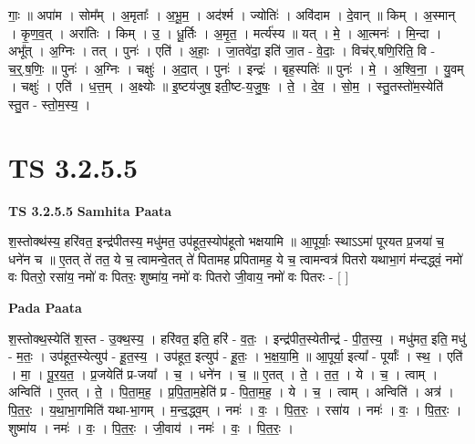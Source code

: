 \documentclass[17pt]{extarticle}
\begin{document}
गाः॒ ॥ अपा॑म । सोम᳚म् । अ॒मृताः᳚ । अ॒भू॒म॒ । अद॑र्श्म । ज्योतिः॑ । अवि॑दाम । दे॒वान् ॥ किम् । अ॒स्मान् । कृ॒ण॒व॒त् । अरा॑तिः । किम् । उ॒ । धू॒र्तिः । अ॒मृ॒त॒ । मर्त्य॑स्य ॥ यत् । मे॒ । आ॒त्मनः॑ । मि॒न्दा । अभू᳚त् । अ॒ग्निः । तत् । पुनः॑ । एति॑ । अ॒हाः॒ । जा॒तवे॑दा॒ इति॑ जा॒त - वे॒दाः॒ । विच॑र्.षणि॒रिति॒ वि - च॒र्॒.ष॒णिः॒ ॥ पुनः॑ । अ॒ग्निः । चक्षुः॑ । अ॒दा॒त् । पुनः॑ । इन्द्रः॑ । बृह॒स्पतिः॑ ॥ पुनः॑ । मे॒ । अ॒श्वि॒ना॒ । यु॒वम् । चक्षुः॑ । एति॑ । ध॒त्त॒म् । अ॒क्ष्योः ॥ इ॒ष्टय॑जुष॒ इती॒ष्ट-य॒जु॒षः॒ । ते॒ । दे॒व॒ । सो॒म॒ । स्तु॒तस्तो॑म॒स्येति॑ स्तु॒त - स्तो॒म॒स्य॒ ।  \newline




\section*{ TS 3.2.5.5 }

\textbf{TS 3.2.5.5 } \newline
\textbf{Samhita Paata} \newline

श॒स्तोक्थ॑स्य॒ हरि॑वत॒ इन्द्र॑पीतस्य॒ मधु॑मत॒ उप॑हूत॒स्योप॑हूतो भक्षयामि ॥ आ॒पूर्याः॒ स्थाऽऽमा॑ पूरयत प्र॒जया॑ च॒ धने॑न च ॥ ए॒तत् ते॑ तत॒ ये च॒ त्वामन्वे॒तत् ते॑ पितामह प्रपितामह॒ ये च॒ त्वामन्वत्र॑ पितरो यथाभा॒गं म॑न्दद्ध्वं॒ नमो॑ वः पितरो॒ रसा॑य॒ नमो॑ वः पितरः॒ शुष्मा॑य॒ नमो॑ वः पितरो जी॒वाय॒ नमो॑ वः पितरः - [  ] \newline

\textbf{Pada Paata} \newline

श॒स्तोक्थ॒स्येति॑ श॒स्त - उ॒क्थ॒स्य॒ । हरि॑वत॒ इति॒ हरि॑ - व॒तः॒ । इन्द्र॑पीत॒स्येतीन्द्र॑ - पी॒त॒स्य॒ । मधु॑मत॒ इति॒ मधु॑ - म॒तः॒ । उप॑हूत॒स्येत्युप॑ - हू॒त॒स्य॒ । उप॑हूत॒ इत्युप॑ - हू॒तः॒ । भ॒क्ष॒या॒मि॒ ॥ आ॒पूर्या॒ इत्या᳚ - पूर्याः᳚ । स्थ॒ । एति॑ । मा॒ । पू॒र॒य॒त॒ । प्र॒जयेति॑ प्र-जया᳚ । च॒ । धने॑न । च॒ ॥ ए॒तत् । ते॒ । त॒त॒ । ये । च॒ । त्वाम् । अन्विति॑ । ए॒तत् । ते॒ । पि॒ता॒म॒ह॒ । प्र॒पि॒ता॒म॒हेति॑ प्र - पि॒ता॒म॒ह॒ । ये । च॒ । त्वाम् । अन्विति॑ । अत्र॑ । पि॒त॒रः॒ । य॒था॒भा॒गमिति॑ यथा-भा॒गम् । म॒न्द॒द्ध्व॒म् । नमः॑ । वः॒ । पि॒त॒रः॒ । रसा॑य । नमः॑ । वः॒ । पि॒त॒रः॒ । शुष्मा॑य । नमः॑ । वः॒ । पि॒त॒रः॒ । जी॒वाय॑ । नमः॑ । वः॒ । पि॒त॒रः॒ ।  \newline




\end{document}

